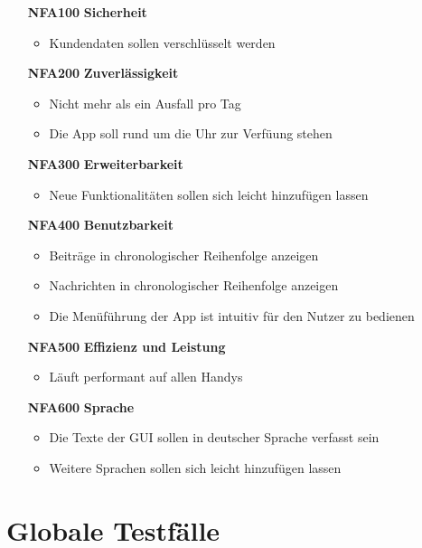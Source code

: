 \documentclass[parskip=full]{scrartcl}
\begin{document}
		\begin{itemize} 
			\item[\textbf{NFA100}] \textbf{Sicherheit} \label{sec:NFA100}
			\begin{itemize}[nosep]
				\item Kundendaten sollen verschlüsselt werden
			\end{itemize}
			\item[\textbf{NFA200}] \textbf{Zuverlässigkeit} \label{sec:NFA200}
			\begin{itemize}[nosep]
				\item Nicht mehr als ein Ausfall pro Tag
				\item Die \gls{App} soll rund um die Uhr zur Verfüung stehen
			\end{itemize}
			\item[\textbf{NFA300}] \textbf{Erweiterbarkeit} \label{sec:NFA300}
			\begin{itemize}[nosep]
				\item Neue Funktionalitäten sollen sich leicht hinzufügen lassen
			\end{itemize}
			\item[\textbf{NFA400}] \textbf{Benutzbarkeit} \label{sec:NFA400}
			\begin{itemize}[nosep]
				\item Beiträge in chronologischer Reihenfolge anzeigen
				\item Nachrichten in chronologischer Reihenfolge anzeigen
				\item 	Die Menüführung der \gls{App} ist intuitiv für den Nutzer zu bedienen
			\end{itemize}
			\item[\textbf{NFA500}] \textbf{Effizienz und Leistung} \label{sec:NFA500}
			\begin{itemize}[nosep]
				\item Läuft performant auf allen Handys
			\end{itemize}
			\item[\textbf{NFA600}] \textbf{Sprache} \label{sec:NFA600}
			\begin{itemize}[nosep]
				\item Die Texte der GUI sollen in deutscher Sprache verfasst sein
				\item Weitere Sprachen sollen sich leicht hinzufügen lassen
			\end{itemize}
		\end{itemize}	
		
		\newpage
		\section{Globale Testfälle}
		
\end{document}
